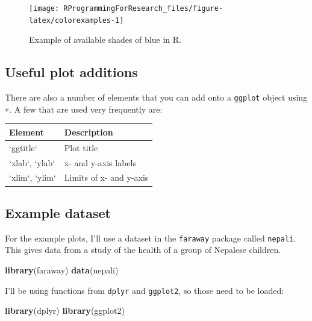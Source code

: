 \documentclass[]{book}
\makeatletter
\newenvironment{Shaded}{\begin{snugshade}}{\end{snugshade}}
\newcommand{\KeywordTok}[1]{\textcolor[rgb]{0.13,0.29,0.53}{\textbf{#1}}}
\newcommand{\NormalTok}[1]{#1}
\newenvironment{kframe}{%
\medskip{}
\setlength{\fboxsep}{.8em}
 \def\at@end@of@kframe{}%
 \ifinner\ifhmode%
  \def\at@end@of@kframe{\end{minipage}}%
  \begin{minipage}{\columnwidth}%
 \fi\fi%
 \def\FrameCommand##1{\hskip\@totalleftmargin \hskip-\fboxsep
 \colorbox{shadecolor}{##1}\hskip-\fboxsep
     \hskip-\linewidth \hskip-\@totalleftmargin \hskip\columnwidth}%
 \MakeFramed {\advance\hsize-\width
   \@totalleftmargin\z@ \linewidth\hsize
   \@setminipage}}%
 {\par\unskip\endMakeFramed%
 \at@end@of@kframe}
\renewenvironment{Shaded}{\begin{kframe}}{\end{kframe}}
\theoremstyle{definition}
\theoremstyle{definition}
\theoremstyle{definition}
\theoremstyle{remark}
\makeatother
\begin{document}
\begin{figure}

{\centering \texttt{[image: RProgrammingForResearch\_files/figure-latex/colorexamples-1]} 

}

\caption{Example of available shades of blue in R.}\label{fig:colorexamples}
\end{figure}

\subsection{Useful plot additions}\label{useful-plot-additions}

There are also a number of elements that you can add onto a
\texttt{ggplot} object using \texttt{+}. A few that are used very
frequently are:

\begin{tabular}{l|l}
\hline
Element & Description\\
\hline
`ggtitle` & Plot title\\
\hline
`xlab`, `ylab` & x- and y-axis labels\\
\hline
`xlim`, `ylim` & Limits of x- and y-axis\\
\hline
\end{tabular}

\subsection{Example dataset}\label{example-dataset}

For the example plots, I'll use a dataset in the \texttt{faraway}
package called \texttt{nepali}. This gives data from a study of the
health of a group of Nepalese children.

\begin{Shaded}
\begin{Highlighting}[]
\KeywordTok{library}\NormalTok{(faraway)}
\KeywordTok{data}\NormalTok{(nepali)}
\end{Highlighting}
\end{Shaded}

I'll be using functions from \texttt{dplyr} and \texttt{ggplot2}, so
those need to be loaded:

\begin{Shaded}
\begin{Highlighting}[]
\KeywordTok{library}\NormalTok{(dplyr)}
\KeywordTok{library}\NormalTok{(ggplot2)}
\end{Highlighting}
\end{Shaded}
\end{document}
